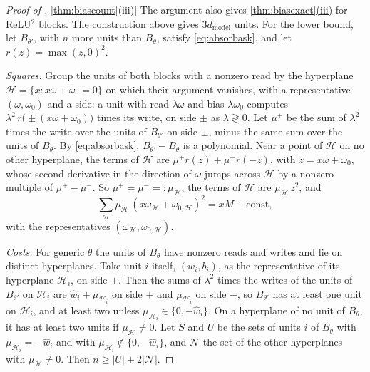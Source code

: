 \documentclass[10pt]{article}
\theoremstyle{definition}
\theoremstyle{remark}
\newcommand{\dm}{d_{\mathrm{model}}}
\DeclareRobustCommand{\cpref}[2]{\hyperref[#1:#2]{\cref*{#1}(#2)}}
\begin{document}
\begin{proof}[Proof of \cpref{thm:biascount}{iii}]
The argument also gives \cpref{thm:biasexact}{iii} for ReLU$^2$ blocks. The construction above gives $3\dm$ units. For the lower bound, let $B_{\theta'}$, with $n$ more units than $B_\theta$, satisfy \eqref{eq:absorbask}, and let $r(z) = \max(z, 0)^2$.

\emph{Squares.} Group the units of both blocks with a nonzero read by the hyperplane $\mathcal H = \{x : x\omega + \omega_0 = 0\}$ on which their argument vanishes, with a representative $(\omega, \omega_0)$ and a side: a unit with read $\lambda\omega$ and bias $\lambda\omega_0$ computes $\lambda^2\,r\big(\pm(x\omega + \omega_0)\big)$ times its write, on side $\pm$ as $\lambda \gtrless 0$. Let $\mu^\pm$ be the sum of $\lambda^2$ times the write over the units of $B_{\theta'}$ on side $\pm$, minus the same sum over the units of $B_\theta$. By \eqref{eq:absorbask}, $B_{\theta'} - B_\theta$ is a polynomial. Near a point of $\mathcal H$ on no other hyperplane, the terms of $\mathcal H$ are $\mu^+r(z) + \mu^-r(-z)$, with $z = x\omega + \omega_0$, whose second derivative in the direction of $\omega$ jumps across $\mathcal H$ by a nonzero multiple of $\mu^+ - \mu^-$. So $\mu^+ = \mu^- =: \mu_{\mathcal H}$, the terms of $\mathcal H$ are $\mu_{\mathcal H}\,z^2$, and
\begin{equation}\label{eq:biassquares}
\textstyle\sum_{\mathcal H}\mu_{\mathcal H}\,(x\omega_{\mathcal H} + \omega_{0,\mathcal H})^2 = xM + \text{const},
\end{equation}
with the representatives $(\omega_{\mathcal H}, \omega_{0,\mathcal H})$.

\emph{Costs.} For generic $\theta$ the units of $B_\theta$ have nonzero reads and writes and lie on distinct hyperplanes. Take unit $i$ itself, $(w_i, b_i)$, as the representative of its hyperplane $\mathcal H_i$, on side $+$. Then the sums of $\lambda^2$ times the writes of the units of $B_{\theta'}$ on $\mathcal H_i$ are $\hat w_i + \mu_{\mathcal H_i}$ on side $+$ and $\mu_{\mathcal H_i}$ on side $-$, so $B_{\theta'}$ has at least one unit on $\mathcal H_i$, and at least two unless $\mu_{\mathcal H_i} \in \{0, -\hat w_i\}$. On a hyperplane of no unit of $B_\theta$, it has at least two units if $\mu_{\mathcal H} \neq 0$. Let $S$ and $U$ be the sets of units $i$ of $B_\theta$ with $\mu_{\mathcal H_i} = -\hat w_i$ and with $\mu_{\mathcal H_i} \notin \{0, -\hat w_i\}$, and $\mathcal N$ the set of the other hyperplanes with $\mu_{\mathcal H} \neq 0$. Then $n \ge \lvert U\rvert + 2\lvert\mathcal N\rvert$.


\end{proof}
\end{document}
